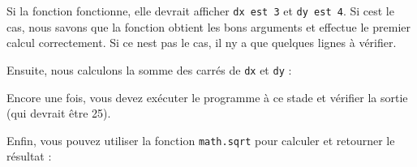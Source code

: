 Si la fonction fonctionne, elle devrait afficher \texttt{dx\ est\ 3} et
\texttt{dy\ est\ 4}. Si c\textquotesingle est le cas, nous savons que la
fonction obtient les bons arguments et effectue le premier calcul
correctement. Si ce n\textquotesingle est pas le cas, il
n\textquotesingle y a que quelques lignes à vérifier.

Ensuite, nous calculons la somme des carrés de \texttt{dx} et
\texttt{dy} :

\begin{Shaded}
\begin{Highlighting}[]
\OperatorTok{=}\OperatorTok{{-}}
\OperatorTok{=}\OperatorTok{{-}}
\OperatorTok{=}\OperatorTok{**}
\OperatorTok{=}\OperatorTok{**}
    \NormalTok{(}
    \NormalTok{(}
     
\end{Highlighting}
\end{Shaded}

Encore une fois, vous devez exécuter le programme à ce stade et vérifier
la sortie (qui devrait être 25).

Enfin, vous pouvez utiliser la fonction \texttt{math.sqrt} pour calculer
et retourner le résultat :

\begin{Shaded}
\begin{Highlighting}[]

\OperatorTok{=}\OperatorTok{{-}}
\OperatorTok{=}\OperatorTok{{-}}
\OperatorTok{=}\OperatorTok{**}
\OperatorTok{=}\OperatorTok{**}
\OperatorTok{=}\OperatorTok{+}
\end{Highlighting}
\end{Shaded}

